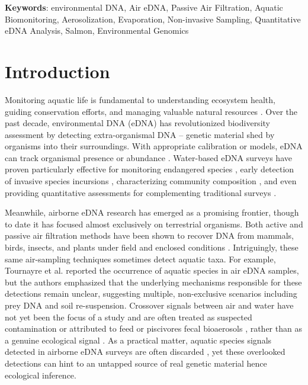 \documentclass{article}
\begin{document}
\textbf{Keywords}: environmental DNA, Air eDNA, Passive Air Filtration, Aquatic Biomonitoring, Aerosolization, Evaporation, Non-invasive Sampling, Quantitative eDNA Analysis, Salmon, Environmental Genomics

\section{Introduction}
Monitoring aquatic life is fundamental to understanding ecosystem health, guiding conservation efforts, and managing valuable natural resources \cite{dudgeon2006, reid2019}. Over the past decade, environmental DNA (eDNA) has revolutionized biodiversity assessment by detecting extra-organismal DNA -- genetic material shed by organisms into their surroundings. With appropriate calibration or models, eDNA can track organismal presence or abundance \cite{guri2024a}. Water-based eDNA surveys have proven particularly effective for monitoring endangered species \cite{biggs2015}, early detection of invasive species incursions \cite{thomas2020}, characterizing community composition \cite{wilkinson2024}, and even providing quantitative assessments for complementing traditional surveys \cite{allan2023, guri2024a, tillotson2018}.

Meanwhile, airborne eDNA research has emerged as a promising frontier, though to date it has focused almost exclusively on terrestrial organisms. Both active and passive air filtration methods have been shown to recover DNA from mammals, birds, insects, and plants under field and enclosed conditions \cite{clare2021, garrett2023, johnson2019, johnson2023, lynggaard2024, roger2022, lynggaard2022}. Intriguingly, these same air-sampling techniques sometimes detect aquatic taxa. For example, Tournayre et al. \cite{tournayre2025} reported the occurrence of aquatic species in air eDNA samples, but the authors emphasized that the underlying mechanisms responsible for these detections remain unclear, suggesting multiple, non-exclusive scenarios including prey DNA and soil re-suspension. Crossover signals between air and water have not yet been the focus of a study and are often treated as suspected contamination or attributed to feed or piscivores fecal bioaerosols \cite{sullivan2023, klepke2022, lynggaard2023, lynggaard2022}, rather than as a genuine ecological signal \cite{tournayre2025}. As a practical matter, aquatic species signals detected in airborne eDNA surveys are often discarded \cite{sullivan2023, klepke2022, lynggaard2023, altermatt2025}, yet these overlooked detections can hint to an untapped source of real genetic material hence ecological inference.
\end{document}
